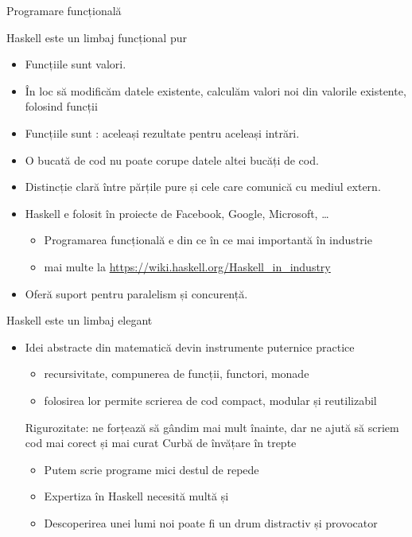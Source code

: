\documentclass[xcolor=pdftex,romanian,colorlinks]{beamer}
\begin{document}
\begin{section}{Programare funcțională}
\begin{frame}{Haskell este un limbaj funcțional pur}
\begin{itemize}
\item Funcțiile sunt valori.
\item În loc să modificăm datele existente, calculăm valori noi din valorile existente, folosind funcții
\item Funcțiile sunt : aceleași rezultate pentru aceleași intrări.
\item O bucată de cod nu poate corupe datele altei bucăți de cod.
\item Distincție clară între părțile pure și cele care comunică cu mediul extern.
\end{itemize}

\begin{itemize}
\item Haskell e folosit în proiecte de Facebook, Google, Microsoft, \ldots
\begin{itemize}
\item Programarea funcțională e din ce în ce mai importantă în industrie 
\item mai multe la \url{https://wiki.haskell.org/Haskell_in_industry}
\end{itemize} 
\item  Oferă suport pentru paralelism și concurență.


\end{itemize}
\end{frame}

\begin{frame}{Haskell este un limbaj elegant}
\begin{itemize}
\item Idei abstracte din matematică devin instrumente puternice practice 
\begin{itemize}
\item recursivitate, compunerea de funcții, functori, monade 
\item folosirea lor permite scrierea de cod compact, modular și reutilizabil
\end{itemize}
\vitem Rigurozitate:  ne forțează să gândim mai mult înainte, dar ne ajută să scriem cod mai corect și mai curat
\vitem Curbă de învățare în trepte
\begin{itemize}
\item Putem scrie programe mici destul de repede
\item Expertiza în Haskell necesită multă  și 
\item Descoperirea unei lumi noi poate fi un drum distractiv și provocator


\end{itemize}
\end{itemize}
\end{frame}
\end{section}
\end{document}

